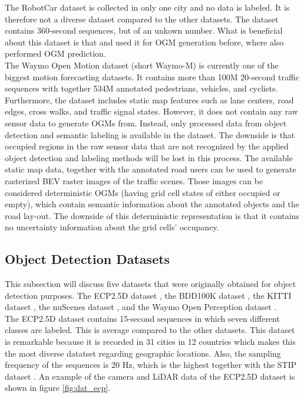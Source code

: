 The RobotCar dataset \cite{robotcardatasetijrr} is collected in only one city and no data is labeled. It is therefore not a diverse dataset compared to the other datasets. The dataset contains 360-second sequences, but of an unkown number. What is beneficial about this dataset is that \cite{dequaire2018deep} and \cite{wang2020l2r} used it for \gls{OGM} generation before, where \cite{dequaire2018deep} also performed \gls{OGM} prediction. \\

The Waymo Open Motion dataset \cite{ettinger2021large} (short Waymo-M) is currently one of the biggest motion forecasting datasets. It contains more than 100M 20-second traffic sequences with together 534M annotated pedestrians, vehicles, and cyclists. Furthermore, the dataset includes static map features such as lane centers, road edges, cross walks, and traffic signal states. However, it does not contain any raw sensor data to generate \glspl{OGM} from. Instead, only processed data from object detection and semantic labeling is available in the dataset. The downside is that occupied regions in the raw sensor data that are not recognized by the applied object detection and labeling methods will be lost in this process. The available static map data, together with the annotated road users can be used to generate rasterized \gls{BEV} raster images of the traffic scenes. Those images can be considered deterministic \glspl{OGM} (having grid cell states of either occupied or empty), which contain semantic information about the annotated objects and the road lay-out. The downside of this deterministic representation is that it contains no uncertainty information about the grid cells' occupancy.


\subsection{Object Detection Datasets} \label{subsec:data_ob_det}
This subsection will discuss five datasets that were originally obtained for object detection purposes. The \gls{ECP2.5D} dataset \cite{braun2020ecp2}, the \gls{BDD100K} dataset \cite{yu2020bdd100k}, the \gls{KITTI} dataset \cite{geiger2012we}, the nuScenes dataset \cite{caesar2020nuscenes}, and the Waymo Open Perception dataset \cite{sun2020scalability}. \\

The \gls{ECP2.5D} dataset \cite{braun2020ecp2} contains 15-second sequences in which seven different classes are labeled. This is average compared to the other datasets. This dataset is remarkable because it is recorded in 31 cities in 12 countries which makes this the most diverse datatset regarding geographic locations. Also, the sampling frequency of the sequences is 20 Hz, which is the highest together with the \gls{STIP} dataset \cite{liu2020spatiotemporal}. An example of the camera and LiDAR data of the \gls{ECP2.5D} dataset \cite{braun2020ecp2} is shown in figure \ref{fig:dat_ecp}. \\

